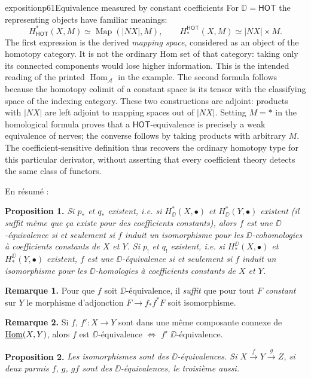 \begin{dcomment}{exposition}{p61}{Equivalence measured by constant coefficients}
For $\mathbb D=\mathsf{HOT}$ the representing objects have familiar meanings:
\[
 H^*_{\mathsf{HOT}}(X,M)\simeq
 \operatorname{Map}(|NX|,M),
 \qquad
 H_*^{\mathsf{HOT}}(X,M)\simeq |NX|\times M.
\]
The first expression is the derived \emph{mapping space}, considered as an object of the homotopy category. It is not the ordinary Hom set of that category: taking only its connected components would lose higher information. This is the intended reading of the printed $\operatorname{Hom}_{\mathcal A}$ in the example. The second formula follows because the homotopy colimit of a constant space is its tensor with the classifying space of the indexing category. These two constructions are adjoint: products with $|NX|$ are left adjoint to mapping spaces out of $|NX|$. Setting $M=*$ in the homological formula proves that a $\mathsf{HOT}$-equivalence is precisely a weak equivalence of nerves; the converse follows by taking products with arbitrary $M$. The coefficient-sensitive definition thus recovers the ordinary homotopy type for this particular derivator, without asserting that every coefficient theory detects the same class of functors.
\end{dcomment}


\noindent En résumé :

\noindent\textbf{Proposition 1.} \textit{Si $p_*$ et $q_*$ existent, i.e. si $H^*_{\DD}(X, \bullet)$ et $H^*_{\DD}(Y, \bullet)$ existent (il suffit même que ça existe pour des coefficients constants), alors $f$ est une $\DD$-équivalence si et seulement si $f$ induit un isomorphisme pour les $\DD$-cohomologies à coefficients constants de $X$ et $Y$. Si $p_!$ et $q_!$ existent, i.e. si $H^{\DD}_*(X, \bullet)$ et $H^{\DD}_*(Y, \bullet)$ existent, $f$ est une $\DD$-équivalence si et seulement si $f$ induit un isomorphisme pour les $\DD$-homologies à coefficients constants de $X$ et $Y$.}

\noindent\textbf{Remarque 1.} Pour que $f$ soit $\DD$-équivalence, il \textit{suffit} que pour tout $F$ \textit{constant} sur $Y$ le morphisme d'adjonction $F \to f_*f^*F$ soit isomorphisme.

\noindent\textbf{Remarque 2.} Si $f$, $f' : X \to Y$ sont dans une même composante connexe de $\underline{\operatorname{Hom}}(X, Y)$, alors $f$ est $\DD$-équivalence $\Leftrightarrow$ $f'$ $\DD$-équivalence.

\noindent\textbf{Proposition 2.} \textit{Les isomorphismes sont des $\DD$-équivalences. Si $X \overset{f}{\to} Y \overset{g}{\to} Z$, si deux parmis $f$, $g$, $gf$ sont des $\DD$-équivalences, le troisième aussi.} %

